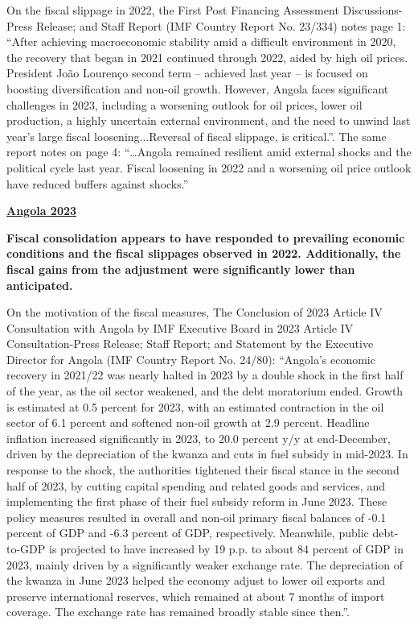 On the fiscal slippage in 2022, the First Post Financing Assessment Discussions-Press Release; and Staff Report (IMF Country Report No. 23/334) notes page 1: “After achieving macroeconomic stability amid a difficult environment in 2020, the recovery that began in 2021 continued through 2022, aided by high oil prices. President João Lourenço second term – achieved last year – is focused on boosting diversification and non-oil growth. However, Angola faces significant challenges in 2023, including a worsening outlook for oil prices, lower oil production, a highly uncertain external environment, and the need to unwind last year’s large fiscal loosening...Reversal of fiscal slippage, is critical.”. The same report notes on page 4: “…Angola remained resilient amid external shocks and the political cycle last year. Fiscal loosening in 2022 and a worsening oil price outlook have reduced buffers against shocks.” 

\textbf{\underline{Angola 2023}}

\textbf{Fiscal consolidation appears to have responded to prevailing economic conditions and the fiscal slippages observed in 2022. Additionally, the fiscal gains from the adjustment were significantly lower than anticipated.}

On the motivation of the fiscal measures, The Conclusion of 2023 Article IV Consultation with Angola by IMF Executive Board in 2023 Article IV Consultation-Press Release; Staff Report; and Statement by the Executive Director for Angola (IMF Country Report No. 24/80): “Angola’s economic recovery in 2021/22 was nearly halted in 2023 by a double shock in the first half of the year, as the oil sector weakened, and the debt moratorium ended. Growth is estimated at 0.5 percent for 2023, with an estimated contraction in the oil sector of 6.1 percent and softened non-oil growth at 2.9 percent. Headline inflation increased significantly in 2023, to 20.0 percent y/y at end-December, driven by the depreciation of the kwanza and cuts in fuel subsidy in mid-2023.
In response to the shock, the authorities tightened their fiscal stance in the second half of 2023, by cutting capital spending and related goods and services, and implementing the first phase of their fuel subsidy reform in June 2023. These policy measures resulted in overall and non-oil primary fiscal balances of -0.1 percent of GDP and -6.3 percent of GDP, respectively. Meanwhile, public debt-to-GDP is projected to have increased by 19 p.p. to about 84 percent of GDP in 2023, mainly driven by a significantly weaker exchange rate. The depreciation of the kwanza in June 2023 helped the economy adjust to lower oil exports and preserve international reserves, which remained at about 7 months of import coverage. The exchange rate has remained broadly stable since then.”. 

